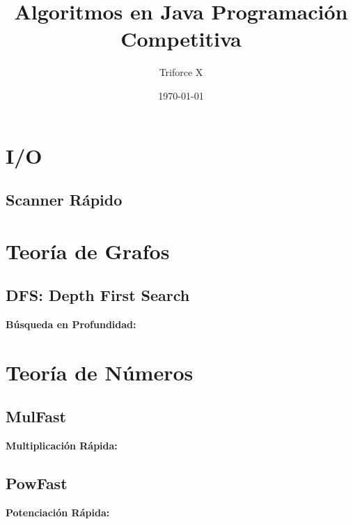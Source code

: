 \documentclass[10pt,letterpaper,twocolumn]{article}
\newcommand{\codigofuente}[1]{

\dotfill
}
\begin{document}
\title{Algoritmos en Java Programación Competitiva}
\author{Triforce X}
\date{\today}
\maketitle

\tableofcontents
\section{I/O}
\subsection{Scanner Rápido}
\small
\codigofuente{./src/scanner1.java}

\section{Teoría de Grafos}
\subsection{DFS: Depth First Search}
\small
\textbf{Búsqueda en Profundidad:}
\codigofuente{./src/teoria_de_grafos/dfs.java}

\section{Teoría de Números}
\subsection{MulFast}
\small
\textbf{Multiplicación Rápida:}
\codigofuente{./src/teoria_de_numeros/mul_fast.java}

\subsection{PowFast}
\small
\textbf{Potenciación Rápida:}
\codigofuente{./src/teoria_de_numeros/pow_fast.java}
\end{document}
